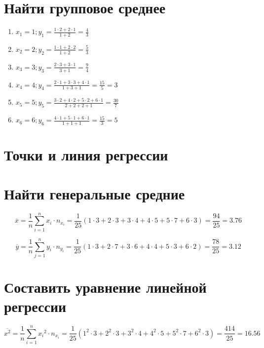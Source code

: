 \newpage

\section{Найти групповое среднее}

\begin{enumerate}
    \item $x_1 = 1; y_1 = \frac{1 \cdot 2 + 2 \cdot 1}{1 + 2} = \frac{4}{3}$
    \item $x_2 = 2; y_2 = \frac{1 \cdot 1 + 2 \cdot 2}{1 + 2} = \frac{5}{3}$
    \item $x_3 = 3; y_3 = \frac{2 \cdot 3 + 3 \cdot 1}{3 + 1} = \frac{9}{4}$
    \item $x_4 = 4; y_4 = \frac{2 \cdot 1 + 3 \cdot 3 + 4 \cdot 1}{1 + 3 + 1} = \frac{15}{5} = 3$
    \item $x_5 = 5; y_5 = \frac{3 \cdot 2 + 4 \cdot 2 + 5 \cdot 2 + 6 \cdot 1}{2 + 2 + 2 + 1} = \frac{30}{7}$
    \item $x_6 = 6; y_6 = \frac{4 \cdot 1 + 5 \cdot 1 + 6 \cdot 1}{1 + 1 + 1} = \frac{15}{3} = 5$
\end{enumerate}

\section{Точки и линия регрессии}


\section{Найти генеральные средние}

$$\overline{x} = \frac{1}{n} \sum^{n}_{i=1}{x_i \cdot n_{x_i}} = \frac{1}{25} (1 \cdot 3 + 2 \cdot 3 + 3 \cdot 4 + 4 \cdot 5 + 5 \cdot 7 + 6 \cdot 3) = \frac{94}{25} = 3.76$$

$$\overline{y} = \frac{1}{n} \sum^{n}_{j=1}{y_i \cdot n_{y_i}} = \frac{1}{25} (1 \cdot 3 + 2 \cdot 7 + 3 \cdot 6 + 4 \cdot 4 + 5 \cdot 3 + 6 \cdot 2) = \frac{78}{25} = 3.12$$

\section{Составить уравнение линейной регрессии}

$$\overline{x^2} = \frac{1}{n} \sum^{n}_{i=1}{{x_i}^2 \cdot n_{x_i}} = \frac{1}{25} (1^2 \cdot 3 + 2^2 \cdot 3 + 3^2 \cdot 4 + 4^2 \cdot 5 + 5^2 \cdot 7 + 6^2 \cdot 3) = \frac{414}{25} = 16.56$$

